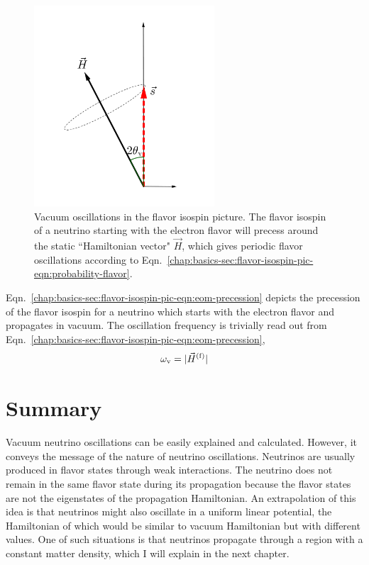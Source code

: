 \begin{figure}
    \centering
    \vspace*{-20pt}
    \includegraphics[width=0.6\textwidth]{chapters/assets/basics/flavor-isospin-vac-osc}
    \caption{Vacuum oscillations in the flavor isospin picture. The flavor isospin of a neutrino starting with the electron flavor will precess around the static ``Hamiltonian vector" $\vec H$, which gives periodic flavor oscillations according to Eqn.~\ref{chap:basics-sec:flavor-isospin-pic-eqn:probability-flavor}.}
    \label{chap:basics-sec:flavor-isospin-pic-fig:flavor-isospin-vac-osc}
\end{figure}

Eqn.~\ref{chap:basics-sec:flavor-isospin-pic-eqn:eom-precession} depicts the precession of the flavor isospin for a neutrino which starts with the electron flavor and propagates in vacuum. The oscillation frequency is trivially read out from Eqn.~\ref{chap:basics-sec:flavor-isospin-pic-eqn:eom-precession},
\begin{equation}
\omega_\mathrm v = \lvert \vec{H}^{(\mathrm f)} \rvert
\end{equation}











\section{Summary}

Vacuum neutrino oscillations can be easily explained and calculated. However, it conveys the message of the nature of neutrino oscillations. Neutrinos are usually produced in flavor states through weak interactions. The neutrino does not remain in the same flavor state during its propagation because the flavor states are not the eigenstates of the propagation Hamiltonian. An extrapolation of this idea is that neutrinos might also oscillate in a uniform linear potential, the Hamiltonian of which would be similar to vacuum Hamiltonian but with different values. One of such situations is that neutrinos propagate through a region with a constant matter density, which I will explain in the next chapter.
